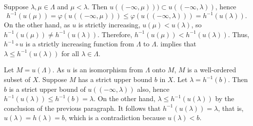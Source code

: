 \documentclass{article}
\begin{document}
\begin{solution}[\ref{exe:k8tmok20}]
  Suppose \(\lambda, \mu \in \Lambda\) and \(\mu < \lambda\).  Then
  \(u((-\infty, \mu))) \subset u((-\infty, \lambda))\), hence
  \begin{displaymath}
    h^{-1}(u(\mu)) = \varphi(u((-\infty, \mu))) \leq
    \varphi(u((-\infty, \lambda))) = h^{-1}(u(\lambda)).
  \end{displaymath}
  On the other hand, as \(u\) is strictly increasing,
  \(u(\mu) < u(\lambda)\), so
  \(h^{-1}(u(\mu)) \neq h^{-1}(u(\lambda))\).  Therefore,
  \(h^{-1}(u(\mu)) < h^{-1}(u(\lambda))\). Thus, \(h^{-1} \circ u\) is
  a strictly increasing function from \(\Lambda\) to \(\Lambda\).
   implies that \(\lambda \leq h^{-1}(u(\lambda))\)
  for all \(\lambda \in \Lambda\).

  Let \(M = u(\Lambda)\).  As \(u\) is an isomorphism from \(\Lambda\)
  onto \(M\), \(M\) is a well-ordered subset of \(X\).  Suppose \(M\)
  has a strict upper bound \(b\) in \(X\).  Let
  \(\lambda = h^{-1}(b)\).  Then \(b\) is a strict upper bound of
  \(u((-\infty, \lambda))\) also, hence
  \(h^{-1}(u(\lambda)) \leq h^{-1}(b) = \lambda\).  On the other hand,
  \(\lambda \leq h^{-1}(u(\lambda))\) by the conclusion of the
  previous paragraph.  It follows that
  \(h^{-1}(u(\lambda)) = \lambda\), that is,
  \(u(\lambda) = h(\lambda) = b\), which is a contradiction because
  \(u(\lambda) < b\).


\end{solution}
\end{document}
